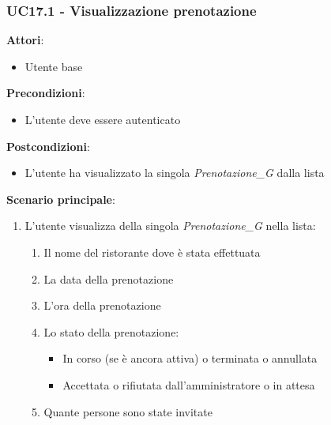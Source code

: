 \subsubsection{UC17.1 - Visualizzazione prenotazione}\label{usecase:17_1}
\textbf{Attori}:
\begin{itemize}
    \item Utente base
\end{itemize}
\textbf{Precondizioni}:
\begin{itemize}
    \item L'utente deve essere autenticato
\end{itemize}
\textbf{Postcondizioni}:
\begin{itemize}
    \item L'utente ha visualizzato la singola \textit{Prenotazione_G} dalla lista
\end{itemize}
\textbf{Scenario principale}:
\begin{enumerate}
    \item L'utente visualizza della singola \textit{Prenotazione_G} nella lista:
    \begin{enumerate}
        \item Il nome del ristorante dove è stata effettuata
        \item La data della prenotazione
        \item L'ora della prenotazione
        \item Lo stato della prenotazione:
            \begin{itemize}
                \item In corso (se è ancora attiva) o terminata  o annullata
                \item Accettata o rifiutata dall'amministratore o in attesa
        \end{itemize}
        \item Quante persone sono state invitate
    \end{enumerate}
\end{enumerate}
\newpage